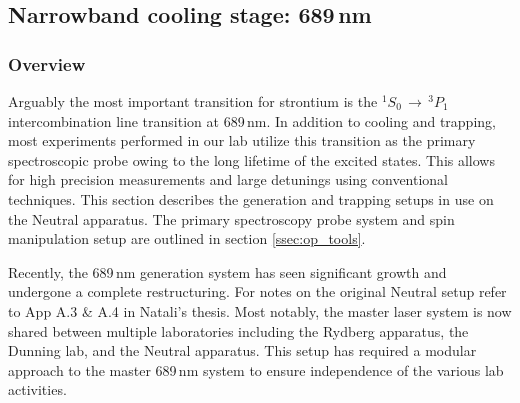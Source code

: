 \pagebreak
\subsection{Narrowband cooling stage: 689\,nm} \label{ssec:689sys}
\subsubsection{Overview}
Arguably the most important transition for strontium is the $^1S_0\,\rightarrow\,^3P_1$ intercombination line transition at 689\,nm.
In addition to cooling and trapping, most experiments performed in our lab utilize this transition as the primary spectroscopic probe owing to the long lifetime of the excited states.
This allows for high precision measurements and large detunings using conventional techniques.
This section describes the generation and trapping setups in use on the Neutral apparatus.
The primary spectroscopy probe system and spin manipulation setup are outlined in section \ref{ssec:op_tools}.

Recently, the 689\,nm generation system has seen significant growth and undergone a complete restructuring. 
For notes on the original Neutral setup refer to App A.3 \& A.4 in Natali's thesis.
Most notably, the master laser system is now shared between multiple laboratories including the Rydberg apparatus, the Dunning lab, and the Neutral apparatus.
This setup has required a modular approach to the master 689\,nm system to ensure independence of the various lab activities.

